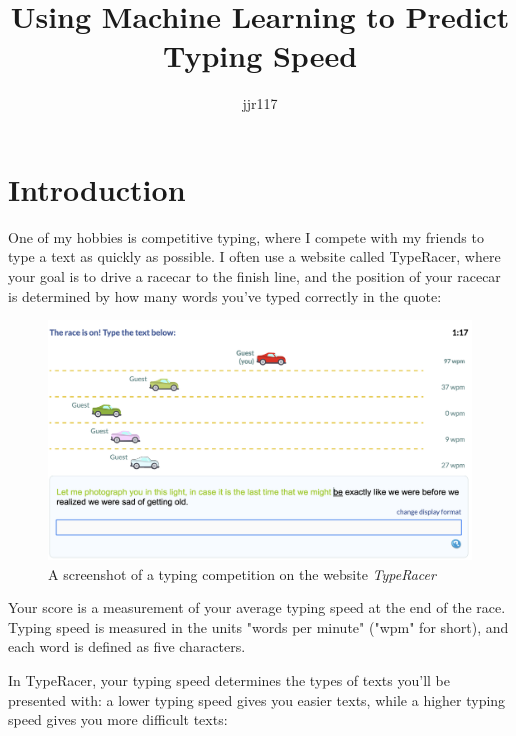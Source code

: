 \documentclass[12pt, demo]{article}
\title{Using Machine Learning to Predict Typing Speed}
\author{jjr117}
\date{}
\begin{document}
\maketitle

\section*{Introduction}

One of my hobbies is competitive typing, where I compete with my friends to type a text as quickly as possible. I often use a website called TypeRacer, where your goal is to drive a racecar to the finish line, and the position of your racecar is determined by how many words you've typed correctly in the quote:

\begin{figure}[hbt!]
	\caption{A screenshot of a typing competition on the website \textit{TypeRacer}}
	\includegraphics[width=\textwidth]{typeracer.png}
\end{figure}

Your score is a measurement of your average typing speed at the end of the race. Typing speed is measured in the units "words per minute" ("wpm" for short), and each word is defined as five characters.

In TypeRacer, your typing speed determines the types of texts you'll be presented with: a lower typing speed gives you easier texts, while a higher typing speed gives you more difficult texts:
\end{document}
